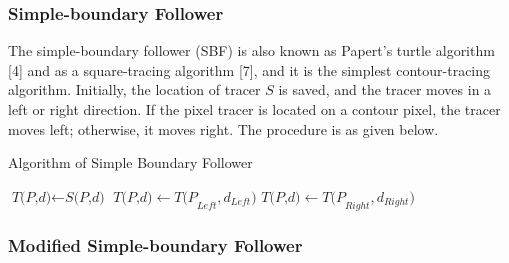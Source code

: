 \subsubsection{Simple-boundary Follower}


The simple-boundary follower (SBF) is also known as Papert’s turtle algorithm [4] and as a square-tracing algorithm [7], and it is the simplest contour-tracing algorithm. Initially, the location of tracer $S$ is saved, and the tracer moves in a left or right direction. If the pixel tracer is located on a contour pixel, the tracer moves left; otherwise, it moves right. The procedure is as given below.

\begin{algorithm}
	\caption{Algorithm of Simple Boundary Follower}\label{alg:sbf}
	\begin{algorithmic}[1]
	\State $\textit{T(P,d)} \gets \textit{S(P,d)}$
	\Do
	\State $\textit{T(P,d)} \gets \textit{T(P}_{Left},\textit{d}_{Left} )  $
	\Else
	\State $\textit{T(P,d)} \gets \textit{T(P}_{Right},\textit{d}_{Right})$
	\EndIf
	\EndProcedure
	\end{algorithmic}
\end{algorithm}

\subsubsection{Modified Simple-boundary Follower}


